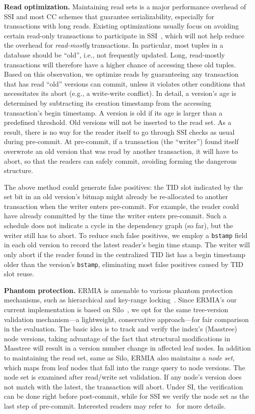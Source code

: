 {\bf Read optimization.}
Maintaining read sets is a major performance overhead of SSI and most CC schemes that guarantee serializability, especially for transactions with long reads. Existing optimizations usually focus on avoiding certain read-only transactions to participate in SSI~\cite{PortsG12}, which will not help reduce the overhead for \textit{read-mostly} transactions. In particular, most tuples in a database should be ``old'', i.e., not frequently updated. Long, read-mostly transactions will therefore have a higher chance of accessing these old tuples. Based on this observation, we optimize reads by guaranteeing any transaction that has read ``old'' versions can commit, unless it violates other conditions that necessitates its abort (e.g., a write-write conflict). In detail, a version's age is determined by subtracting its creation timestamp from the accessing transaction's begin timestamp. A version is old if its age is larger than a predefined threshold. Old versions will not be inserted to the read set. As a result, there is no way for the reader itself to go through SSI checks as usual during pre-commit. At pre-commit, if a transaction (the ``writer'') found itself overwrote an old version that was read by another transaction, it will have to abort, so that the readers can safely commit, avoiding forming the dangerous structure.

The above method could generate false positives: the TID slot indicated by the set bit in an old version's bitmap might already be re-allocated to another transaction when the writer enters pre-commit. For example, the reader could have already committed by the time the writer enters pre-commit. Such a schedule does not indicate a cycle in the dependency graph (so far), but the writer still has to abort. To reduce such false positives, we employ a \texttt{bstamp} field in each old version to record the latest reader's begin time stamp. The writer will only abort if the reader found in the centralized TID list has a begin timestamp older than the version's \texttt{bstamp}, eliminating most false positives caused by TID slot reuse.

{\bf Phantom protection.} ERMIA is amenable to various phantom protection mechanisms, such as hierarchical and key-range locking~\cite{KimuraGK12,Lomet93}. Since ERMIA's our current implementation is based on Silo~\cite{TuZKLM13}, we opt for the same tree-version validation mechanism---a lightweight, conservative approach---for fair comparison in the evaluation. The basic idea is to track and verify the index's (Masstree) node versions, taking advantage of the fact that structural modifications in Masstree will result in a version number change in affected leaf nodes. In addition to maintaining the read set, same as Silo, ERMIA also maintains a \textit{node set}, which maps from leaf nodes that fall into the range query to node versions. The node set is examined after read/write set validation. If any node's version does not match with the latest, the transaction will abort. Under SI, the verification can be done right before post-commit, while for SSI we verify the node set as the last step of pre-commit. Interested readers may refer to~\cite{TuZKLM13} for more details.

